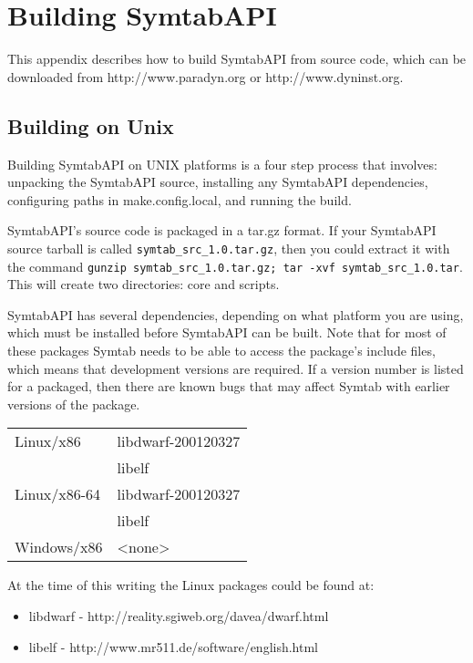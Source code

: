 \appendix

\section{Building SymtabAPI}

This appendix describes how to build SymtabAPI from source code, which can be
downloaded from http://www.paradyn.org or http://www.dyninst.org.  

\subsection{Building on Unix}

Building SymtabAPI on UNIX platforms is a four step process that involves:
unpacking the SymtabAPI source, installing any SymtabAPI dependencies,
configuring paths in make.config.local, and running the build.  

SymtabAPI's source code is packaged in a tar.gz format. If your SymtabAPI
source tarball is called \texttt{symtab\_src\_1.0.tar.gz}, then you could extract
it with the command \texttt{gunzip symtab\_src\_1.0.tar.gz; tar -xvf
symtab\_src\_1.0.tar}. This will create two directories: core and scripts.  

SymtabAPI has several dependencies, depending on what platform you are using,
which must be installed before SymtabAPI can be built. Note that for most of
these packages Symtab needs to be able to access the package's include files,
which means that development versions are required. If a version number is
listed for a packaged, then there are known bugs that may affect Symtab with
earlier versions of the package. 

\begin{center}
    \begin{tabular}{ll}
Linux/x86       & libdwarf-200120327 \\
                & libelf\\
Linux/x86-64    & libdwarf-200120327 \\
                & libelf \\
Windows/x86     & <none> \\
\end{tabular}
\end{center}

At the time of this writing the Linux packages could be found at:
\begin{itemize}
    \item libdwarf - http://reality.sgiweb.org/davea/dwarf.html
    \item libelf - http://www.mr511.de/software/english.html
\end{itemize}

